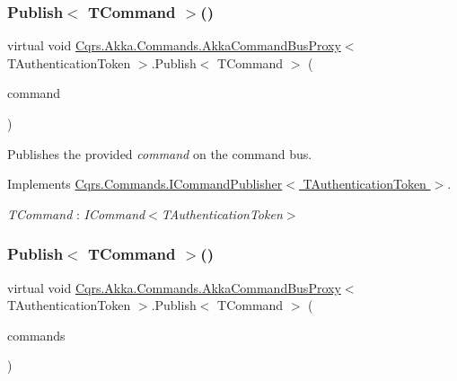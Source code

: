 \subsubsection{\texorpdfstring{Publish$<$ T\+Command $>$()}{Publish< TCommand >()}\hspace{0.1cm}{\footnotesize\ttfamily [1/2]}}
{\footnotesize\ttfamily virtual void \hyperlink{classCqrs_1_1Akka_1_1Commands_1_1AkkaCommandBusProxy}{Cqrs.\+Akka.\+Commands.\+Akka\+Command\+Bus\+Proxy}$<$ T\+Authentication\+Token $>$.Publish$<$ T\+Command $>$ (\begin{DoxyParamCaption}\item[{T\+Command}]{command }\end{DoxyParamCaption})\hspace{0.3cm}{\ttfamily [virtual]}}



Publishes the provided {\itshape command}  on the command bus. 



Implements \hyperlink{interfaceCqrs_1_1Commands_1_1ICommandPublisher_aeeb487ad5686d9c44d214b1daaf7833a_aeeb487ad5686d9c44d214b1daaf7833a}{Cqrs.\+Commands.\+I\+Command\+Publisher$<$ T\+Authentication\+Token $>$}.

\begin{Desc}
\item[Type Constraints]\begin{description}
\item[{\em T\+Command} : {\em I\+Command$<$T\+Authentication\+Token$>$}]\end{description}
\end{Desc}
\mbox{\label{classCqrs_1_1Akka_1_1Commands_1_1AkkaCommandBusProxy_a81dc8162ca933d84b6aee04aff589010_a81dc8162ca933d84b6aee04aff589010}} 
\subsubsection{\texorpdfstring{Publish$<$ T\+Command $>$()}{Publish< TCommand >()}\hspace{0.1cm}{\footnotesize\ttfamily [2/2]}}
{\footnotesize\ttfamily virtual void \hyperlink{classCqrs_1_1Akka_1_1Commands_1_1AkkaCommandBusProxy}{Cqrs.\+Akka.\+Commands.\+Akka\+Command\+Bus\+Proxy}$<$ T\+Authentication\+Token $>$.Publish$<$ T\+Command $>$ (\begin{DoxyParamCaption}\item[{I\+Enumerable$<$ T\+Command $>$}]{commands }\end{DoxyParamCaption})\hspace{0.3cm}{\ttfamily [virtual]}}



